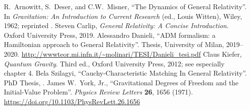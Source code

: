 
\begin{thebibliography}{99}
  R.~Arnowitt, S.~Deser, and C.W.~Misner,
  ``The Dynamics of General Relativity''.
  In \emph{Gravitation: An Introduction to Current Research}
  (ed., Louis Witten), Wiley, 1962; reprinted .
  Steven Carlip,
  \emph{General Relativity: A Concise Introduction}.
  Oxford University Press, 2019.
  Alessandro Danieli,
  ``ADM formalism: a Hamiltonian approach to General Relativity''.
  Thesis, University of Milan, 2019--2020.\newline
  \url{http://wwwteor.mi.infn.it/~molinari/TESI/Danieli_tesi.pdf}
  Claus Kiefer,
  \emph{Quantum Gravity}.
  Third ed., Oxford University Press, 2012; see especially chapter 4.
  Bela Szilagyi,
  ``Cauchy-Characteristic Matching In General Relativity''.
  PhD Thesis, .
  James W.~York, Jr.,
  ``Gravitational Degrees of Freedom and the Initial-Value Problem''.
  \emph{Physics Review Letters} \textbf{26}, 1656 (1971).\newline
  \url{https://doi.org/10.1103/PhysRevLett.26.1656}
\end{thebibliography}